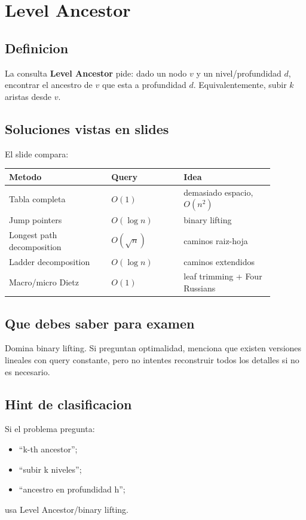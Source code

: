 \documentclass[10pt]{article}
\newcommand{\bigO}{O}
\begin{document}
\newpage
\section{Level Ancestor}

\subsection{Definicion}
La consulta \textbf{Level Ancestor} pide: dado un nodo $v$ y un nivel/profundidad
$d$, encontrar el ancestro de $v$ que esta a profundidad $d$. Equivalentemente,
subir $k$ aristas desde $v$.

\subsection{Soluciones vistas en slides}
El slide compara:
\begin{center}
\begin{tabular}{p{0.34\linewidth}p{0.24\linewidth}p{0.30\linewidth}}
\toprule
Metodo & Query & Idea \\
\midrule
Tabla completa & $\bigO(1)$ & demasiado espacio, $\bigO(n^2)$ \\
Jump pointers & $\bigO(\log n)$ & binary lifting \\
Longest path decomposition & $\bigO(\sqrt n)$ & caminos raiz-hoja \\
Ladder decomposition & $\bigO(\log n)$ & caminos extendidos \\
Macro/micro Dietz & $\bigO(1)$ & leaf trimming + Four Russians \\
\bottomrule
\end{tabular}
\end{center}

\subsection{Que debes saber para examen}
Domina binary lifting. Si preguntan optimalidad, menciona que existen versiones
lineales con query constante, pero no intentes reconstruir todos los detalles si
no es necesario.

\subsection{Hint de clasificacion}
Si el problema pregunta:
\begin{itemize}[leftmargin=*]
\item ``k-th ancestor'';
\item ``subir k niveles'';
\item ``ancestro en profundidad h'';
\end{itemize}
usa Level Ancestor/binary lifting.
\end{document}
